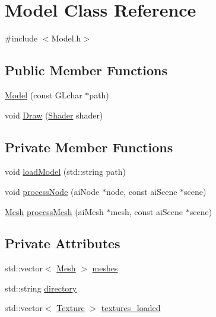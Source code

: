\hypertarget{classModel}{}\section{Model Class Reference}
\label{classModel}


{\ttfamily \#include $<$Model.\+h$>$}

\subsection*{Public Member Functions}
\begin{DoxyCompactItemize}
\item 
\mbox{\hyperlink{classModel_a97ced90b9b512521b2e5bdeaeac6b907}{Model}} (const G\+Lchar $\ast$path)
\item 
void \mbox{\hyperlink{classModel_a191a00d937b9e911bf4881ea14d79b6c}{Draw}} (\mbox{\hyperlink{classShader}{Shader}} shader)
\end{DoxyCompactItemize}
\subsection*{Private Member Functions}
\begin{DoxyCompactItemize}
\item 
void \mbox{\hyperlink{classModel_a3cd88224a93dc81a8503d42be807eb86}{load\+Model}} (std\+::string path)
\item 
void \mbox{\hyperlink{classModel_a23b167ce0d33f7e6ab5693cd5e81a9a5}{process\+Node}} (ai\+Node $\ast$node, const ai\+Scene $\ast$scene)
\item 
\mbox{\hyperlink{classMesh}{Mesh}} \mbox{\hyperlink{classModel_a95ae1a9980ded3d98b1c8785cb889d96}{process\+Mesh}} (ai\+Mesh $\ast$mesh, const ai\+Scene $\ast$scene)
\end{DoxyCompactItemize}
\subsection*{Private Attributes}
\begin{DoxyCompactItemize}
\item 
std\+::vector$<$ \mbox{\hyperlink{classMesh}{Mesh}} $>$ \mbox{\hyperlink{classModel_a538e42901dcfba59471072a48a162163}{meshes}}
\item 
std\+::string \mbox{\hyperlink{classModel_a5ea3aa111c7a7d179e93dcc0bb567701}{directory}}
\item 
std\+::vector$<$ \mbox{\hyperlink{structTexture}{Texture}} $>$ \mbox{\hyperlink{classModel_a866353fd9967b57286864fac87799ae1}{textures\+\_\+loaded}}
\end{DoxyCompactItemize}


